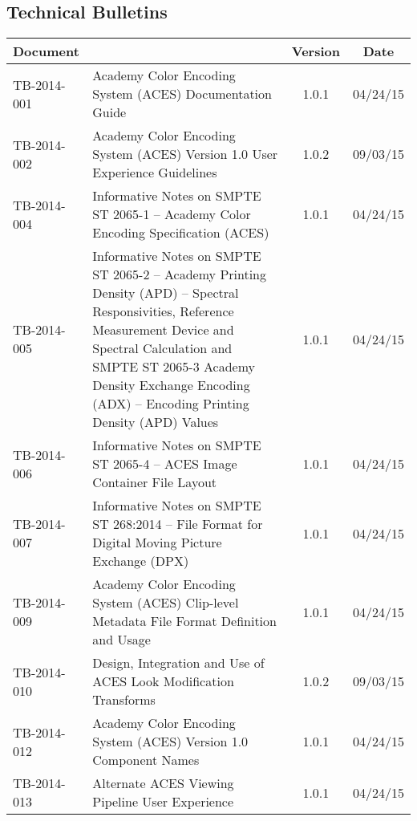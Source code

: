\documentclass[10pt]{academydoc}
\begin{document}
\subsection*{Technical Bulletins}
\begin{tabularx}{\linewidth}{|l X|c|c|}
\hline
\textbf{Document} & & \textbf{Version} & \textbf{Date} \\ \hline
TB-2014-001 & Academy Color Encoding System (ACES) Documentation Guide & 1.0.1 & 04/24/15 \\ \hline
TB-2014-002 & Academy Color Encoding System (ACES) Version 1.0 User Experience Guidelines & 1.0.2 & 09/03/15 \\ \hline
TB-2014-004 & Informative Notes on SMPTE ST 2065-1 -- Academy Color Encoding Specification (ACES) & 1.0.1 & 04/24/15 \\ \hline
TB-2014-005 & Informative Notes on SMPTE ST 2065-2 -- Academy Printing Density (APD) -- Spectral Responsivities, Reference Measurement Device and Spectral Calculation and SMPTE ST 2065-3 Academy Density Exchange Encoding (ADX) -- Encoding Printing Density (APD) Values & 1.0.1 & 04/24/15 \\ \hline
TB-2014-006 & Informative Notes on SMPTE ST 2065-4 -- ACES Image Container File Layout & 1.0.1 & 04/24/15 \\ \hline
TB-2014-007 & Informative Notes on SMPTE ST 268:2014 -- File Format for Digital Moving Picture Exchange (DPX) & 1.0.1 & 04/24/15 \\ \hline
TB-2014-009 & Academy Color Encoding System (ACES) Clip-level Metadata File Format Definition and Usage & 1.0.1 & 04/24/15 \\ \hline
TB-2014-010 & Design, Integration and Use of ACES Look Modification Transforms & 1.0.2 & 09/03/15 \\ \hline
TB-2014-012 & Academy Color Encoding System (ACES) Version 1.0 Component Names & 1.0.1 & 04/24/15 \\ \hline
TB-2014-013 & Alternate ACES Viewing Pipeline User Experience & 1.0.1 & 04/24/15 \\ \hline
\end{tabularx}
\end{document}
